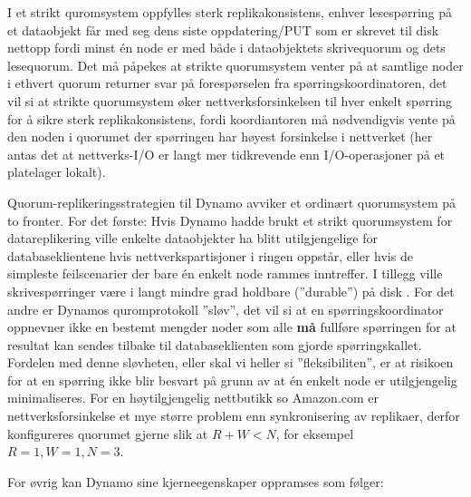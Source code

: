 I et strikt quromsystem oppfylles sterk replikakonsistens, enhver lesespørring på et dataobjekt får med seg dens siste oppdatering/PUT som er skrevet til disk nettopp fordi minst én node er med både i dataobjektets skrivequorum og dets lesequorum. Det må påpekes at strikte quorumsystem venter på at samtlige noder i ethvert quorum returner svar på forespørselen fra spørringskoordinatoren, det vil si at strikte quorumsystem øker nettverksforsinkelsen til hver enkelt spørring for å sikre sterk replikakonsistens, fordi koordiantoren må nødvendigvis vente på den noden i quorumet der spørringen har høyest forsinkelse i nettverket (her antas det at nettverks-I/O er langt mer tidkrevende enn I/O-operasjoner på et platelager lokalt).

Quorum-replikeringsstrategien til Dynamo avviker et ordinært quorumsystem på to fronter. For det første: Hvis Dynamo hadde brukt et strikt quorumsystem for datareplikering ville enkelte dataobjekter ha blitt utilgjengelige for databaseklientene hvis nettverkspartisjoner i ringen oppstår, eller hvis de simpleste feilscenarier der bare én enkelt node rammes inntreffer. I tillegg ville skrivespørringer være i langt mindre grad holdbare (''durable'') på disk \citep{decandia2007}. For det andre er Dynamos quromprotokoll ''sløv'', det vil si at en spørringskoordinator oppnevner ikke en bestemt mengder noder som alle \textbf{må} fullføre spørringen for at resultat kan sendes tilbake til databaseklienten som gjorde spørringskallet. Fordelen med denne sløvheten, eller skal vi heller si ''fleksibiliten'', er at risikoen for at en spørring ikke blir besvart på grunn av at én enkelt node er utilgjengelig minimaliseres. For en høytilgjengelig nettbutikk so Amazon.com er nettverksforsinkelse et mye større problem enn synkronisering av replikaer, derfor konfigureres quorumet gjerne slik at \(R + W < N\), for eksempel \(R = 1, W =1, N = 3\).

For øvrig kan Dynamo sine kjerneegenskaper oppramses som følger:

